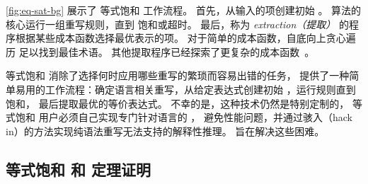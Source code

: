 \autoref{fig:eq-sat-bg} 展示了 等式饱和 工作流程。
首先，从输入的项创建初始 \egraph。
算法的核心运行一组重写规则，直到 \egraph 饱和或超时。
最后，称为 \textit{extraction（提取）} 的程序根据某些成本函数选择最优表示的项。
对于简单的成本函数，自底向上贪心遍历 \egraph 足以找到最佳术语。
其他提取程序已经探索了更复杂的成本函数~\cite{spores, wu_siga19}。

等式饱和 消除了选择何时应用哪些重写的繁琐而容易出错的任务，
提供了一种简单易用的工作流程：确定语言相关重写，从给定表达式创建初始 \egraph ，运行规则直到饱和，
  最后提取最优的等价表达式。
不幸的是，这种技术仍然是特别定制的，
  等式饱和 用户必须自己实现专门针对语言的 \egraph，
  避免性能问题，并通过骇入（hack in）的方法实现纯语法重写无法支持的解释性推理。
\egg 旨在解决这些困难。

\subsection{等式饱和 和 定理证明}

